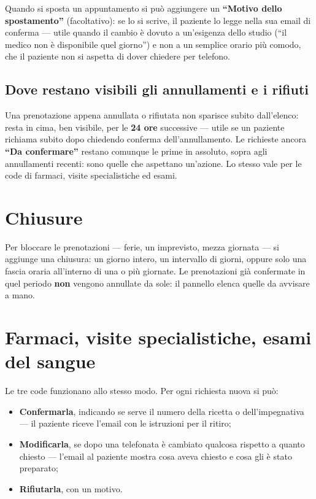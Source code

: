 \documentclass[11pt,a4paper]{article}
\newcommand{\bottone}[1]{\textbf{``#1''}}
\begin{document}
Quando si sposta un appuntamento si può aggiungere un \bottone{Motivo dello spostamento} (facoltativo): se lo si scrive, il paziente lo legge nella sua email di conferma --- utile quando il cambio è dovuto a un'esigenza dello studio (``il medico non è disponibile quel giorno'') e non a un semplice orario più comodo, che il paziente non si aspetta di dover chiedere per telefono.

\subsection*{Dove restano visibili gli annullamenti e i rifiuti}

Una prenotazione appena annullata o rifiutata non sparisce subito dall'elenco: resta in cima, ben visibile, per le \textbf{24 ore} successive --- utile se un paziente richiama subito dopo chiedendo conferma dell'annullamento. Le richieste ancora \bottone{Da confermare} restano comunque le prime in assoluto, sopra agli annullamenti recenti: sono quelle che aspettano un'azione. Lo stesso vale per le code di farmaci, visite specialistiche ed esami.

\section{Chiusure}

Per bloccare le prenotazioni --- ferie, un imprevisto, mezza giornata --- si aggiunge una chiusura: un giorno intero, un intervallo di giorni, oppure solo una fascia oraria all'interno di una o più giornate. Le prenotazioni già confermate in quel periodo \textbf{non} vengono annullate da sole: il pannello elenca quelle da avvisare a mano.

\section{Farmaci, visite specialistiche, esami del sangue}

Le tre code funzionano allo stesso modo. Per ogni richiesta nuova si può:

\begin{itemize}
  \item \textbf{Confermarla}, indicando se serve il numero della ricetta o dell'impegnativa --- il paziente riceve l'email con le istruzioni per il ritiro;
  \item \textbf{Modificarla}, se dopo una telefonata è cambiato qualcosa rispetto a quanto chiesto --- l'email al paziente mostra cosa aveva chiesto e cosa gli è stato preparato;
  \item \textbf{Rifiutarla}, con un motivo.
\end{itemize}
\end{document}

